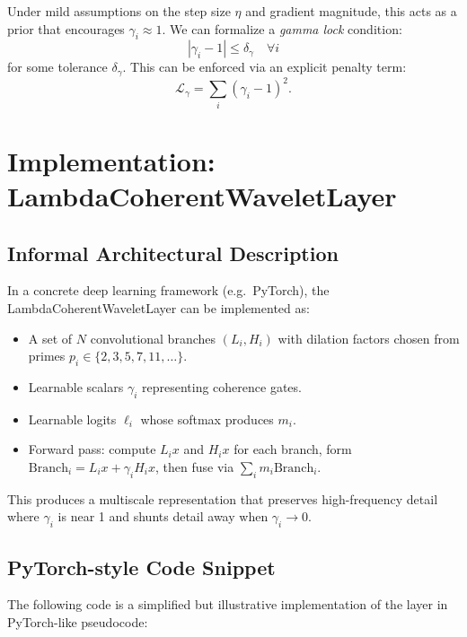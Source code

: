 \documentclass[11pt]{article}
\begin{document}
Under mild assumptions on the step size $\eta$ and gradient magnitude, this acts as a prior that encourages $\gamma_i \approx 1$. We can formalize a \emph{gamma lock} condition:
\[
  |\gamma_i - 1| \le \delta_\gamma \quad \forall i
\]
for some tolerance $\delta_\gamma$. This can be enforced via an explicit penalty term:
\[
  \mathcal{L}_\gamma = \sum_i (\gamma_i - 1)^2.
\]

\section{Implementation: LambdaCoherentWaveletLayer}

\subsection{Informal Architectural Description}

In a concrete deep learning framework (e.g.\ PyTorch), the LambdaCoherentWaveletLayer can be implemented as:

\begin{itemize}
  \item A set of $N$ convolutional branches $(L_i, H_i)$ with dilation factors chosen from primes $p_i \in \{2,3,5,7,11,\dots\}$.
  \item Learnable scalars $\gamma_i$ representing coherence gates.
  \item Learnable logits $\ell_i$ whose softmax produces $m_i$.
  \item Forward pass: compute $L_i x$ and $H_i x$ for each branch, form $\mathrm{Branch}_i = L_i x + \gamma_i H_i x$, then fuse via $\sum_i m_i \mathrm{Branch}_i$.
\end{itemize}

This produces a multiscale representation that preserves high-frequency detail where $\gamma_i$ is near 1 and shunts detail away when $\gamma_i \to 0$.

\subsection{PyTorch-style Code Snippet}

The following code is a simplified but illustrative implementation of the layer in PyTorch-like pseudocode:
\end{document}
